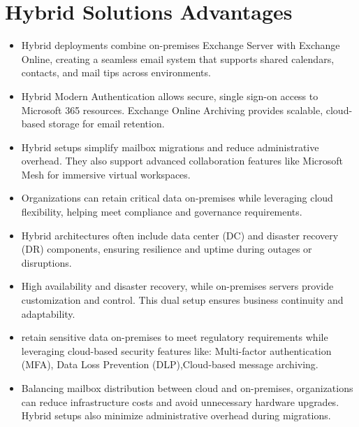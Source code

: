 \section{Hybrid Solutions Advantages}
\begin{itemize}
    \item Hybrid deployments combine on-premises Exchange Server with Exchange Online, creating a seamless email system that supports shared calendars, contacts, and mail tips across environments.
    \item Hybrid Modern Authentication allows secure, single sign-on access to Microsoft 365 resources. Exchange Online Archiving provides scalable, cloud-based storage for email retention.
    \item Hybrid setups simplify mailbox migrations and reduce administrative overhead. They also support advanced collaboration features like Microsoft Mesh for immersive virtual workspaces.
    \item Organizations can retain critical data on-premises while leveraging cloud flexibility, helping meet compliance and governance requirements.
    \item Hybrid architectures often include data center (DC) and disaster recovery (DR) components, ensuring resilience and uptime during outages or disruptions.
    \item High availability and disaster recovery, while on-premises servers provide customization and control. This dual setup ensures business continuity and adaptability.
    \item retain sensitive data on-premises to meet regulatory requirements while leveraging cloud-based security features like: Multi-factor authentication (MFA), Data Loss Prevention (DLP),Cloud-based message archiving.
    \item Balancing mailbox distribution between cloud and on-premises, organizations can reduce infrastructure costs and avoid unnecessary hardware upgrades. Hybrid setups also minimize administrative overhead during migrations.
\end{itemize}
